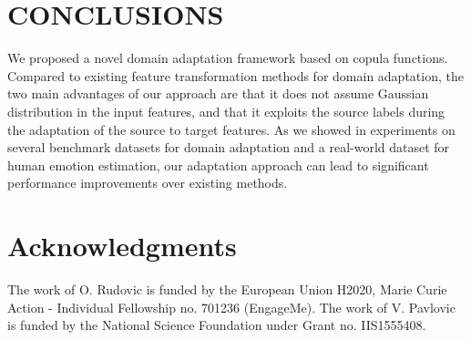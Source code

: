 \documentclass{article}
\newcommand{\todo}[1]{\textcolor{red}{#1}}
\begin{document}
    \section{CONCLUSIONS }
	\label{sec:copyright}
	
	We proposed a novel domain adaptation framework based on copula functions. Compared to existing feature transformation methods for domain adaptation, the two main advantages of our approach are that it does not assume Gaussian distribution in the input features, and that it exploits the source labels during the adaptation of the source to target features. As we showed in  experiments on several benchmark datasets for domain adaptation and a real-world dataset for human emotion estimation,  our adaptation approach can lead to significant performance improvements over existing methods.
	
\section{Acknowledgments}
The work of O. Rudovic is funded by the European Union H2020, Marie Curie Action - Individual Fellowship no. 701236 (EngageMe). The work of V. Pavlovic is funded by the National Science Foundation under Grant no. IIS1555408.	
	
	
	
	
	\small
	
	
	
    
	
\end{document}
